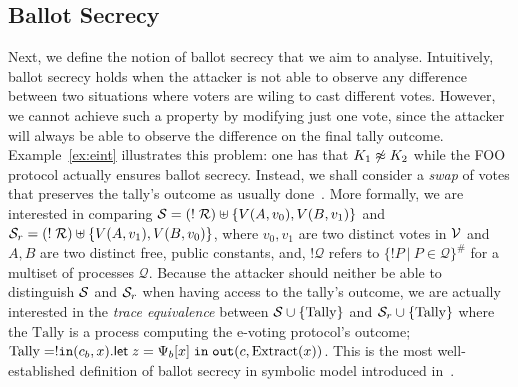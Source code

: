 \newcommand{\Tally}{\mathrm{Tally}}


\subsection{Ballot Secrecy}
\label{sec:frame:ballotsec}
Next, we define the notion of ballot secrecy that we aim to analyse.
Intuitively, ballot secrecy holds when the attacker is not able to observe any difference
between two situations where voters are wiling to cast different votes.
However, we cannot achieve such a property by modifying
just one vote, since the attacker will always be able to observe the difference on the final
tally outcome. 
Example~\ref{ex:eint} illustrates this problem: one has that $K_1\not\eint K_2$ while the FOO protocol
actually ensures ballot secrecy.
Instead, we shall consider a {\em swap} of votes that preserves the tally's outcome as usually done~\cite{KremerRyan2005,DKR-jcs09}.
More formally, we are interested in comparing
$\mathcal{S} = (!\;\roles) \uplus \{V(A,v_0),V(B,v_1)\}$ and
$\mathcal{S}_r = (!\;\roles) \uplus \{V(A,v_1),V(B,v_0)\}$,
where $v_0,v_1$ are two distinct votes in $\V$ and $A,B$ are two
distinct free, public constants, and, 
$! \mathcal{Q}$ refers to $\{!P\ |\ P\in\mathcal{Q}\}^\#$
for a multiset of processes $\mathcal{Q}$.
Because the attacker should neither be able to distinguish $\S$ and $\S_r$
when having access to the tally's outcome,
we are actually interested in the {\em trace equivalence} between $\S\cup\{\Tally\}$
and $\S_r\cup\{\Tally\}$ where
the $\Tally$ is a process computing the e-voting protocol's outcome;
\eg
$\Tally = !\In(c_b,x).\Let\;z=\Psi_b[x]\;\In\;\Out(c,\Extract(x))$.
This is the most well-established definition of ballot secrecy in symbolic model
introduced in~\cite{KremerRyan2005}.



